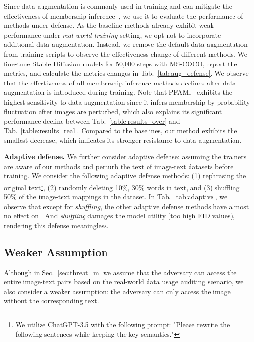 Since data augmentation is commonly used in training and can mitigate the effectiveness of membership inference~\cite{duan2023diffusion}, we use it to evaluate the performance 
 of methods under defense. 
As the baseline methods already exhibit weak performance under \textit{real-world training} setting, we opt not to incorporate additional data augmentation. Instead, we remove the default data augmentation from training scripts \cite{text-to-image-ft-python} to observe the effectiveness change of different methods. We fine-tune Stable Diffusion models for 50,000 steps with MS-COCO, report the metrics, and calculate the metrics changes in Tab.~\ref{tab:aug_defense}. 
We observe that the effectiveness of all membership inference methods declines after data augmentation is introduced during training. 
Note that PFAMI~\cite{fu2023probabilistic} exhibits the highest sensitivity to data augmentation since it infers membership by probability fluctuation after images are perturbed, which also explains its significant performance decline between Tab.~\ref{table:results_over} and Tab.~\ref{table:results_real}.
Compared to the baselines, our method exhibits the smallest decrease, which indicates its stronger resistance to data augmentation. 

\textbf{Adaptive defense.} 
We further consider adaptive defense: assuming the trainers are aware of our methods and perturb the text of image-text datasets before training. We consider the following adaptive defense methods: (1) rephrasing the original text\footnote{We utilize ChatGPT-3.5 with the following prompt: "Please rewrite the following sentences while keeping the key semantics."}, (2) randomly deleting 10\%, 30\% words in text, and (3) shuffling 50\% of the image-text mappings in the dataset.
In Tab.~\ref{tab:adaptive}, we observe that except for \textit{shuffling}, the other adaptive defense methods have almost no effect on \clidth. And \textit{shuffling} damages the model utility (too high FID values), rendering this defense meaningless.

\vspace{-3pt}
\subsection{Weaker Assumption}\label{sec: weak_assumption}
\vspace{-3pt}
Although in Sec.~\ref{sec:threat_m} we assume that the adversary can access the entire image-text pairs based on the real-world data usage auditing scenario, we also consider a weaker assumption: the adversary can only access the image without the corresponding text.

